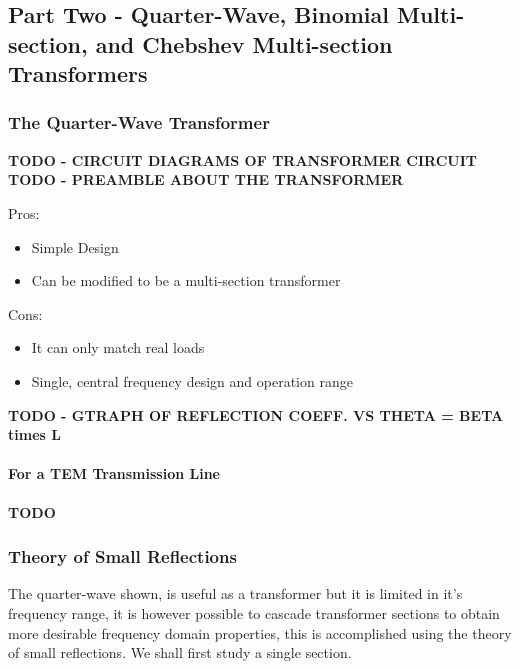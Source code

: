 \documentclass[colorlinks,11pt,a4paper,normalphoto,withhyper,ragged2e]{altareport}
\begin{document}
\pagebreak



\subsection{Part Two - Quarter-Wave, Binomial Multi-section, and Chebshev Multi-section Transformers}

\subsubsection{The Quarter-Wave Transformer}
\textbf{TODO - CIRCUIT DIAGRAMS OF TRANSFORMER CIRCUIT} \linebreak
\textbf{TODO - PREAMBLE ABOUT THE TRANSFORMER} \linebreak

Pros: \linebreak

\begin{itemize}[leftmargin=1cm]
	\item Simple Design
	\item Can be modified to be a multi-section transformer
\end{itemize}


Cons: \linebreak

\begin{itemize}[leftmargin=1cm]
	\item It can only match real loads
	\item Single, central frequency design and operation range
\end{itemize}



\textbf{TODO - GTRAPH OF REFLECTION COEFF. VS THETA = BETA times L}

\paragraph{For a TEM Transmission Line}
\textbf{TODO}




\subsubsection{Theory of Small Reflections}
The quarter-wave shown, is useful as a transformer but it is limited in it's frequency range, it is however possible to cascade transformer sections to obtain more desirable frequency domain properties, this is accomplished using the theory of small reflections. We shall first study a single section. \linebreak
\end{document}

